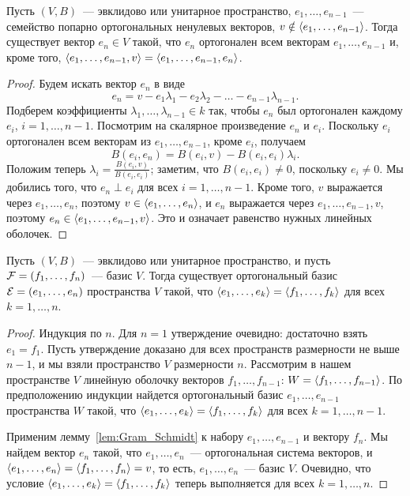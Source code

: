 \begin{lemma}\label{lem:Gram_Schmidt}
Пусть $(V,B)$~--- эвклидово или унитарное пространство,
$e_1,\dots,e_{n-1}$~--- семейство попарно ортогональных ненулевых векторов,
$v\notin\langle e_1,\dots,e_{n-1}\rangle$. Тогда существует вектор $e_n\in V$
такой, что $e_n$ ортогонален всем векторам $e_1,\dots,e_{n-1}$ и,
кроме того, $\langle e_1,\dots,e_{n-1},v\rangle = \langle e_1,\dots,e_{n-1},e_n\rangle$.
\end{lemma}
\begin{proof}
Будем искать вектор $e_n$ в виде
$$
e_n = v - e_1\lambda_1 - e_2\lambda_2 - \dots - e_{n-1}\lambda_{n-1}.
$$
Подберем коэффициенты $\lambda_1,\dots,\lambda_{n-1}\in k$ так, чтобы
$e_n$ был ортогонален каждому $e_i$, $i=1,\dots,n-1$. Посмотрим на
скалярное произведение $e_n$ и $e_i$. Поскольку $e_i$ ортогонален
всем векторам из $e_1,\dots,e_{n-1}$, кроме $e_i$, получаем
$$
B(e_i,e_n) = B(e_i,v) - B(e_i,e_i)\lambda_i.
$$
Положим теперь $\lambda_i = \frac{B(e_i,v)}{B(e_i,e_i)}$; заметим, что
$B(e_i,e_i)\neq 0$, поскольку $e_i\neq 0$. Мы добились того, что
$e_n\perp e_i$ для всех $i=1,\dots,n-1$. Кроме того, $v$ выражается
через $e_1,\dots,e_n$, поэтому $v\in\langle e_1,\dots,e_n\rangle$, и
$e_n$ выражается через $e_1,\dots,e_{n-1},v$, поэтому $e_n\in\langle
e_1,\dots,e_{n-1},v\rangle$. Это и означает равенство нужных линейных оболочек.
\end{proof}

\begin{corollary}\label{cor:Gram_Schmidt_1}
Пусть $(V,B)$~--- эвклидово или унитарное пространство, и пусть
$\mathcal F = (f_1,\dots,f_n)$~--- базис $V$. Тогда существует
ортогональный базис $\mathcal E = (e_1,\dots,e_n)$ пространства $V$ такой,
что $\langle e_1,\dots,e_k\rangle = \langle f_1,\dots,f_k\rangle$ для всех $k=1,\dots,n$.
\end{corollary}
\begin{proof}
Индукция по $n$. Для $n=1$ утверждение очевидно: достаточно взять $e_1
= f_1$. Пусть утверждение доказано для всех пространств размерности не
выше $n-1$, и мы взяли пространство $V$ размерности $n$.
Рассмотрим в нашем пространстве $V$ линейную оболочку
векторов $f_1,\dots,f_{n-1}$: $W = \langle f_1,\dots,f_{n-1}\rangle$. По
предположению индукции найдется ортогональный базис
$e_1,\dots,e_{n-1}$ пространства $W$ такой, что $\langle e_1,\dots,e_k\rangle
= \langle f_1,\dots,f_k\rangle$ для всех $k=1,\dots,n-1$.

Применим лемму~\ref{lem:Gram_Schmidt} к набору $e_1,\dots,e_{n-1}$ и
вектору $f_n$. Мы найдем вектор $e_n$ такой, что $e_1,\dots,e_n$~---
ортогональная система векторов, и $\langle e_1,\dots,e_n\rangle = \langle
f_1,\dots,f_n\rangle = v$, то есть, $e_1,\dots,e_n$~--- базис
$V$. Очевидно, что условие $\langle e_1,\dots,e_k\rangle = \langle
f_1,\dots,f_k\rangle$ теперь выполняется для всех $k=1,\dots,n$.
\end{proof}

